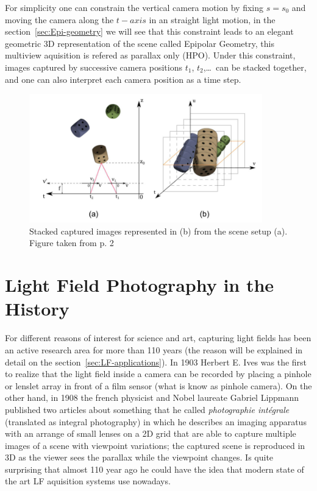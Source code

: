 \bigskip

For simplicity one can constrain the vertical camera motion by fixing $s = s_0$ and moving the camera along the $t-axis$ in an straight light motion, in the section~\ref{sec:Epi-geometry} we will see that this constraint leads to an elegant geometric 3D representation of the scene called Epipolar Geometry, this multiview aquisition is refered as parallax only (HPO). Under this constraint, images captured by successive camera positions $t_1$, $t_2$,\ldots\ can be stacked together, and one can also interpret each camera position as a time step.

\bigskip

\begin{figure}[h!]
\centering
\includegraphics[width= 0.90\textwidth]{./Diagrams/images_stacked.jpg}
\caption{Stacked captured images represented in (b) from the scene setup (a). Figure taken from \cite{LF-Shearlets} p. 2}
\end{figure}

\section{Light Field Photography in the History}

For different reasons of interest for science and art, capturing light fields has been an active research area for more than 110 years (the reason will be explained in detail on the section~\ref{sec:LF-applications}). In 1903 Herbert E. Ives \cite{Ives} was the first to realize that the light field inside a camera can be recorded by placing a pinhole or lenslet array in front of a film sensor (what is know as pinhole camera). On the other hand, in 1908 the french physicist and Nobel laureate Gabriel Lippmann published two articles about something that he called \textit{photographie int\'egrale} (translated as integral photography) \cite{Lippmann} in which he describes an imaging apparatus with an arrange of small lenses on a 2D grid that are able to capture multiple images of a scene with viewpoint variations; the captured scene is reproduced in 3D as the viewer sees the parallax while the viewpoint changes. Is quite surprising that almost 110 year ago he could have the idea that modern state of the art LF aquisition systems use nowadays. 

